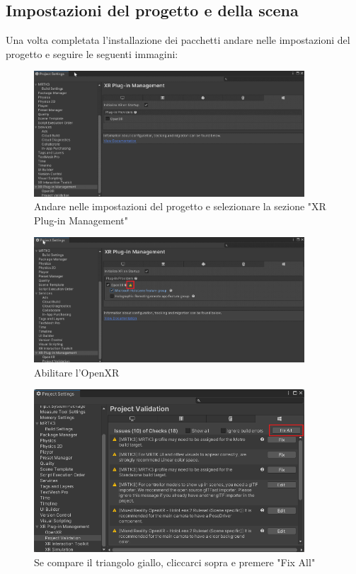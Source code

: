 \subsection{Impostazioni del progetto e della scena}
 Una volta completata l'installazione dei pacchetti andare nelle impostazioni del progetto e seguire le seguenti immagini:
\begin{figure}[H]
    \centering
    \includegraphics[width=0.9\textwidth,height=\textheight,keepaspectratio]{figures/chapter_1/projectSetting1.png}
    \caption{Andare nelle impostazioni del progetto e selezionare la sezione "XR Plug-in Management"}
\end{figure}
\begin{figure}[H]
    \centering
    \includegraphics[width=0.9\textwidth,height=\textheight,keepaspectratio]{figures/chapter_1/projectSetting2.png}
    \caption{Abilitare l'OpenXR}
\end{figure}
\begin{figure}[H]
    \centering
    \includegraphics[width=0.9\textwidth,height=\textheight,keepaspectratio]{figures/chapter_1/projectSetting3.png}
    \caption{Se compare il triangolo giallo, cliccarci sopra e premere "Fix All"}
\end{figure}
